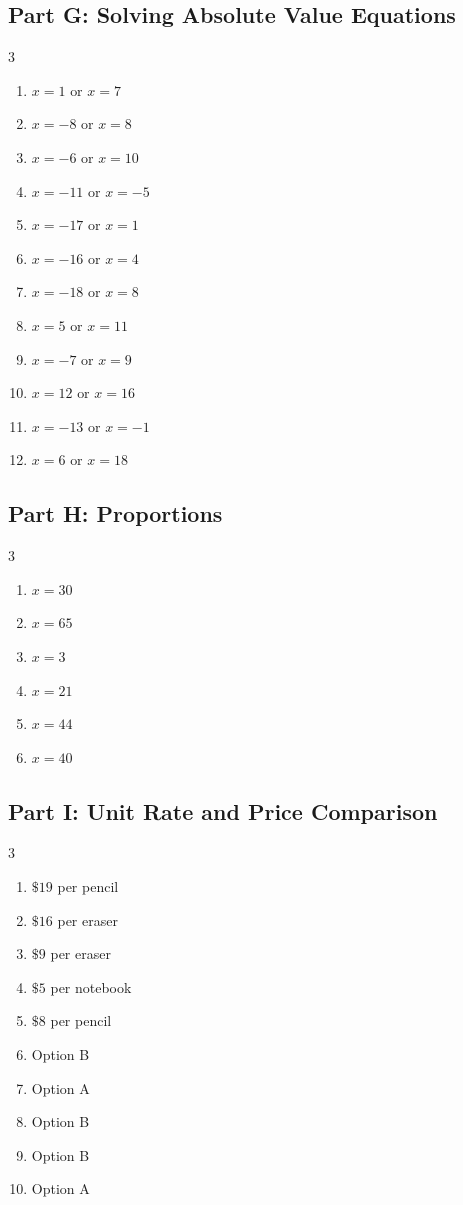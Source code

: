 \documentclass[11pt]{article}
\begin{document}
\subsection*{Part G: Solving Absolute Value Equations}
\begin{multicols}{3}
\begin{enumerate}
  \item $x = 1 \text{ or } x = 7$
  \item $x = -8 \text{ or } x = 8$
  \item $x = -6 \text{ or } x = 10$
  \item $x = -11 \text{ or } x = -5$
  \item $x = -17 \text{ or } x = 1$
  \item $x = -16 \text{ or } x = 4$
  \item $x = -18 \text{ or } x = 8$
  \item $x = 5 \text{ or } x = 11$
  \item $x = -7 \text{ or } x = 9$
  \item $x = 12 \text{ or } x = 16$
  \item $x = -13 \text{ or } x = -1$
  \item $x = 6 \text{ or } x = 18$
\end{enumerate}
\end{multicols}
\subsection*{Part H: Proportions}
\begin{multicols}{3}
\begin{enumerate}
  \item $x = 30$
  \item $x = 65$
  \item $x = 3$
  \item $x = 21$
  \item $x = 44$
  \item $x = 40$
\end{enumerate}
\end{multicols}
\subsection*{Part I: Unit Rate and Price Comparison}
\begin{multicols}{3}
\begin{enumerate}
  \item $\$19$ per pencil
  \item $\$16$ per eraser
  \item $\$9$ per eraser
  \item $\$5$ per notebook
  \item $\$8$ per pencil
  \item Option B
  \item Option A
  \item Option B
  \item Option B
  \item Option A
\end{enumerate}
\end{multicols}
\end{document}
